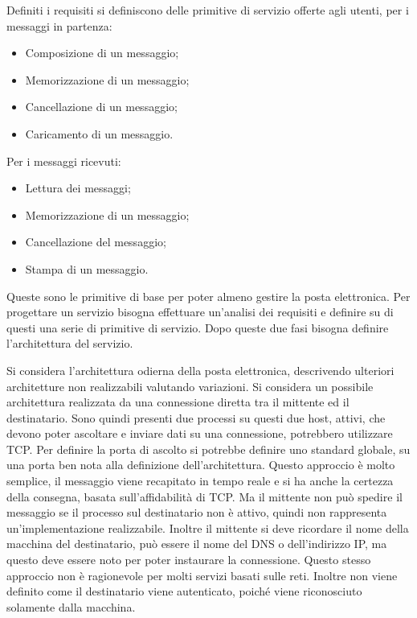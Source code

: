 \documentclass{article}
\numberwithin{equation}{subsection}
\begin{document}
Definiti i requisiti si definiscono delle primitive di servizio offerte agli utenti, per i messaggi in partenza:
\begin{itemize}
    \item Composizione di un messaggio;
    \item Memorizzazione di un messaggio;
    \item Cancellazione di un messaggio;
    \item Caricamento di un messaggio. 
\end{itemize}
Per i messaggi ricevuti:
\begin{itemize}
    \item Lettura dei messaggi;
    \item Memorizzazione di un messaggio;
    \item Cancellazione del messaggio;
    \item Stampa di un messaggio. 
\end{itemize}



Queste sono le primitive di base per poter almeno gestire la posta elettronica. 
Per progettare un servizio bisogna effettuare un'analisi dei requisiti e definire su di questi una serie di primitive di servizio. Dopo queste due fasi bisogna 
definire l'architettura del servizio. 


Si considera l'architettura odierna della posta elettronica, descrivendo ulteriori architetture non realizzabili valutando variazioni. Si considera un possibile architettura realizzata da una connessione diretta tra il mittente ed il destinatario. Sono quindi presenti due processi su questi due host, attivi, che devono poter ascoltare e inviare dati su una connessione, potrebbero utilizzare TCP. Per definire la porta di ascolto si potrebbe definire uno standard globale, su una porta ben nota alla definizione dell'architettura. 
Questo approccio è molto semplice, il messaggio viene recapitato in tempo reale e si ha anche la certezza della consegna, basata sull'affidabilità di TCP. 
Ma il mittente non può spedire il messaggio se il processo sul destinatario non è attivo, quindi non rappresenta un'implementazione realizzabile. Inoltre il mittente si deve ricordare il nome della macchina del destinatario, può essere il nome del DNS o dell'indirizzo IP, ma questo deve essere noto per poter instaurare la connessione. 
Questo stesso approccio non è ragionevole per molti servizi basati sulle reti. Inoltre non viene definito come il destinatario viene autenticato, poiché viene riconosciuto solamente dalla macchina. 
\end{document}
